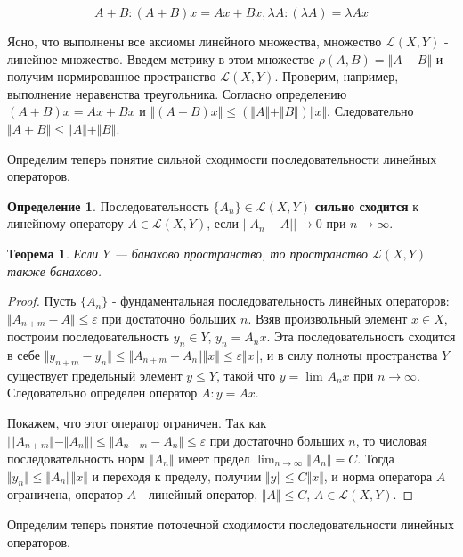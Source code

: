 \documentclass[12pt,a4paper,titlepage,oneside]{book}
\theoremstyle{definition}
\newtheorem*{definition}{Определение}
\theoremstyle{plain}
\newtheorem*{theorem}{Теорема}
\theoremstyle{remark}
\theoremstyle{remark}
\theoremstyle{remark}
\theoremstyle{remark}
\theoremstyle{plain}
\theoremstyle{plain}
\begin{document}
$$A+B: (A+B)x = Ax+Bx, \lambda A: (\lambda A) = \lambda Ax$$

Ясно, что выполнены все аксиомы линейного множества, множество $\mathcal{L}(X,Y)$ - линейное множество. Введем метрику в этом множестве $\rho(A, B) = \Vert A-B\Vert$ и получим нормированное пространство $\mathcal{L}(X,Y)$. Проверим, например, выполнение неравенства треугольника. Согласно определению $(A+B)x = Ax+Bx$ и $\Vert(A+B)x\Vert\le(\Vert A\Vert+\Vert B\Vert)\Vert x\Vert$. Следовательно $\Vert A+B\Vert\le\Vert A\Vert+\Vert B\Vert$.

Определим теперь понятие сильной сходимости последовательности линейных операторов.

\begin{definition}
Последовательность $\{A_n\}\in \mathcal{L}(X,Y)$ \textbf{сильно сходится} к линейному оператору $A\in \mathcal{L}(X,Y)$, если $||A_n-A||\to 0$ при $n\to {\infty}$.
\end{definition}

\begin{theorem}
Если $Y$ --- банахово пространство, то пространство $\mathcal{L}(X,Y)$ также банахово.
\end{theorem}

\begin{proof}
Пусть $\{A_n\}$ - фундаментальная последовательность линейных операторов: $\Vert A_{n+m}-A\Vert\le \varepsilon$ при достаточно больших $n$. Взяв произвольный элемент $x\in X$, построим последовательность $y_n\in Y$, $y_n=A_nx$. Эта последовательность сходится в себе $\Vert y_{n+m}-y_n\Vert\le \Vert A_{n+m}-A_n\Vert \Vert x\Vert\le \varepsilon \Vert x\Vert$, и в силу полноты пространства $Y$ существует предельный элемент $y\le Y$, такой что $y=\lim_{} A_nx$ при $n \to \infty$. Следовательно определен оператор $A: y=Ax$.

Покажем, что этот оператор ограничен. Так как $\lvert \Vert A_{n+m} \Vert-\Vert A_n\Vert \rvert \leqslant \Vert A_{n+m}-A_n\Vert \leqslant \varepsilon$ при достаточно больших $n$, то числовая последовательность норм $\Vert A_n\Vert$ имеет предел $\lim_{n\to \infty} \Vert A_n\Vert=C$. Тогда $\Vert y_n\Vert\le\Vert A_n\Vert \Vert x\Vert$ и переходя к пределу, получим $\Vert y\Vert\le C\Vert x\Vert$, и норма оператора $A$ ограничена, оператор $A$ - линейный оператор, $\Vert A\Vert\le C$, $A\in \mathcal{L}(X,Y)$.
\end{proof}

Определим теперь понятие поточечной сходимости последовательности линейных операторов.
\end{document}
